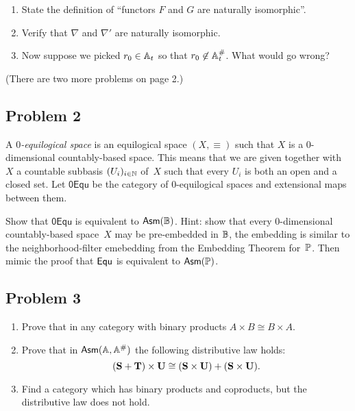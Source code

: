 \documentclass[a4paper,11pt]{article}
\begin{document}
\begin{enumerate}
\item State the definition of ``functors $F$ and $G$ are naturally
  isomorphic''.
\item Verify that $\nabla$ and $\nabla'$ are naturally isomorphic.
\item Now suppose we picked $r_0 \in \mathbb{A}_{t}$ so that $r_0 \not\in
  \mathbb{A}^{\#}_{t}$. What would go wrong?
\end{enumerate}

\begin{center}
  (There are two more problems on page 2.)
\end{center}

\newpage

\subsection*{Problem 2}

A \emph{$0$-equilogical space} is an equilogical space $(X, {\equiv})$
such that $X$ is a $0$-dimensional countably-based space. This means
that we are given together with~$X$ a countable subbasis $(U_i)_{i \in
  \mathbb{N}}$ of~$X$ such that every $U_i$ is both an open and a closed set.
Let $\mathsf{0Equ}$ be the category of $0$-equilogical spaces and
extensional maps between them.

Show that $\mathsf{0Equ}$ is equivalent to $\mathsf{Asm}(\mathbb{B})$. Hint: show
that every $0$-dimensional countably-based space~$X$ may be
pre-embedded in $\mathbb{B}$, the embedding is similar to the
neighborhood-filter emebedding from the Embedding Theorem
for~$\mathbb{P}$. Then mimic the proof that $\mathsf{Equ}$ is equivalent to
$\mathsf{Asm}(\mathbb{P})$.


\subsection*{Problem 3}

\begin{enumerate}
\item Prove that in any category with binary products $A \times B
  \cong B \times A$.
\item 
  Prove that in $\mathsf{Asm}(\mathbb{A},\mathbb{A}^{\#})$ the following distributive law holds:
  \begin{equation*}
    (\mathbf{S} + \mathbf{T}) \times \mathbf{U} \cong
    (\mathbf{S} \times \mathbf{U}) + (\mathbf{S} \times \mathbf{U}).
  \end{equation*}
\item Find a category which has binary products and coproducts, but
  the distributive law does not hold.
\end{enumerate}
\end{document}
